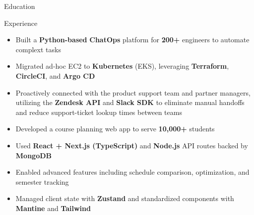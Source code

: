 \documentclass{resume}
\begin{document}
\introduction[
    fullname={Declan Blanchard},
    email={declanblanc@gmail.com},
    linkedin={linkedin.com/in/declanblanc},
    github={github.com/declanblanc}
]

\begin{educationSection}{Education}
    \educationItem[
        university={New Jersey Institute of Technology},
        graduation={May 2026},
        grade={\textbf{3.8 GPA}},
        program={Bachelor's, Computer Science}
    ]
\end{educationSection}

\begin{experienceSection}{Experience}


    \experienceItem[
        company={Patreon},
        location={New York, NY},
        position={Software Engineer Intern},
        duration={May 2025 - August 2025}
    ]
    \begin{itemize}[itemsep=-6pt, leftmargin=2em, rightmargin=0.8em, before=\raggedright, after=\normalfont]
        \item Built a \textbf{Python-based} \textbf{ChatOps} platform for \textbf{200+} engineers to automate complext tasks
        \item Migrated ad-hoc EC2 to \textbf{Kubernetes} (EKS), leveraging \textbf{Terraform}, \textbf{CircleCI}, and \textbf{Argo CD} 
        \item Proactively connected with the product support team and partner managers, utilizing the \textbf{Zendesk API} and \textbf{Slack SDK} to eliminate manual handoffs and reduce support-ticket lookup times between teams 
    \end{itemize}

    \experienceItem[
        company={New Jersey Institute of Technology},
        location={Newark, NJ},
        position={Full Stack Developer},
        duration={January 2025 - Present}
    ]
    \begin{itemize}[itemsep=-6pt, leftmargin=2em, rightmargin=0.8em, before=\raggedright, after=\normalfont]
        \item Developed a course planning web app to serve \textbf{10,000+} students 
        \item Used \textbf{React + Next.js (TypeScript)} and \textbf{Node.js} API routes backed by \textbf{MongoDB}
        \item Enabled advanced features including schedule comparison, optimization, and semester tracking
        \item Managed client state with \textbf{Zustand} and standardized components with \textbf{Mantine} and \textbf{Tailwind}
    \end{itemize}



\end{experienceSection}
\end{document}

